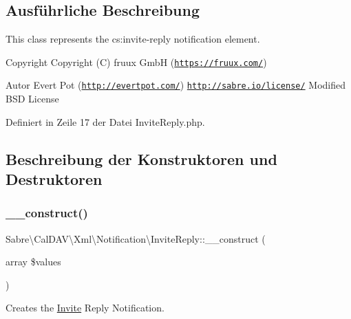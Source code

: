 \subsection{Ausführliche Beschreibung}
This class represents the cs\+:invite-\/reply notification element.

\begin{DoxyCopyright}{Copyright}
Copyright (C) fruux GmbH (\href{https://fruux.com/}{\tt https\+://fruux.\+com/}) 
\end{DoxyCopyright}
\begin{DoxyAuthor}{Autor}
Evert Pot (\href{http://evertpot.com/}{\tt http\+://evertpot.\+com/})  \href{http://sabre.io/license/}{\tt http\+://sabre.\+io/license/} Modified B\+SD License 
\end{DoxyAuthor}


Definiert in Zeile 17 der Datei Invite\+Reply.\+php.



\subsection{Beschreibung der Konstruktoren und Destruktoren}
\mbox{\label{class_sabre_1_1_cal_d_a_v_1_1_xml_1_1_notification_1_1_invite_reply_aaeeb4229682b93f147bf576f23c9ef99}} 
\subsubsection{\texorpdfstring{\+\_\+\+\_\+construct()}{\_\_construct()}}
{\footnotesize\ttfamily Sabre\textbackslash{}\+Cal\+D\+A\+V\textbackslash{}\+Xml\textbackslash{}\+Notification\textbackslash{}\+Invite\+Reply\+::\+\_\+\+\_\+construct (\begin{DoxyParamCaption}\item[{array}]{\$values }\end{DoxyParamCaption})}

Creates the \mbox{\hyperlink{class_sabre_1_1_cal_d_a_v_1_1_xml_1_1_notification_1_1_invite}{Invite}} Reply Notification.

